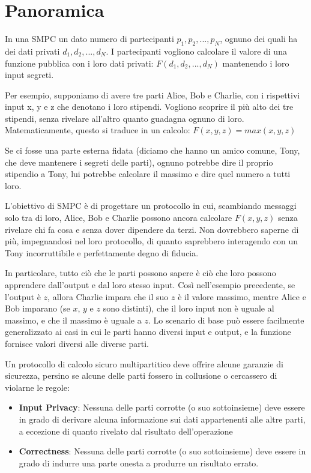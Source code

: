 \documentclass[
  italian,
]{book}
\providecommand{\tightlist}{%
  \setlength{\itemsep}{0pt}\setlength{\parskip}{0pt}}
\begin{document}
\hypertarget{panoramica}{%
\section{Panoramica}\label{panoramica}}

In una SMPC un dato numero di partecipanti \(p_1, p_2, ..., p_N\), ognuno dei quali ha dei dati privati \(d_1, d_2, ..., d_N\). I partecipanti vogliono calcolare il valore di una funzione pubblica con i loro dati privati: \(F(d_1, d_2, ..., d_N)\) mantenendo i loro input segreti.

Per esempio, supponiamo di avere tre parti Alice, Bob e Charlie, con i rispettivi input x, y e z che denotano i loro stipendi. Vogliono scoprire il più alto dei tre stipendi, senza rivelare all'altro quanto guadagna ognuno di loro. Matematicamente, questo si traduce in un calcolo: \(F(x, y, z) = max(x, y, z)\)

Se ci fosse una parte esterna fidata (diciamo che hanno un amico comune, Tony, che deve mantenere i segreti delle parti), ognuno potrebbe dire il proprio stipendio a Tony, lui potrebbe calcolare il massimo e dire quel numero a tutti loro.

L'obiettivo di SMPC è di progettare un protocollo in cui, scambiando messaggi solo tra di loro, Alice, Bob e Charlie possono ancora calcolare \(F(x, y, z)\) senza rivelare chi fa cosa e senza dover dipendere da terzi. Non dovrebbero saperne di più, impegnandosi nel loro protocollo, di quanto saprebbero interagendo con un Tony incorruttibile e perfettamente degno di fiducia.

In particolare, tutto ciò che le parti possono sapere è ciò che loro possono apprendere dall'output e dal loro stesso input. Così nell'esempio precedente, se l'output è \(z\), allora Charlie impara che il suo \(z\) è il valore massimo, mentre Alice e Bob imparano (se \(x\), \(y\) e \(z\) sono distinti), che il loro input non è uguale al massimo, e che il massimo è uguale a \(z\). Lo scenario di base può essere facilmente generalizzato ai casi in cui le parti hanno diversi input e output, e la funzione fornisce valori diversi alle diverse parti.

\newpage

Un protocollo di calcolo sicuro multipartitico deve offrire alcune garanzie di sicurezza, persino se alcune delle parti fossero in collusione o cercassero di violarne le regole:

\begin{itemize}
\tightlist
\item
  \textbf{Input Privacy}: Nessuna delle parti corrotte (o suo sottoinsieme) deve essere in grado di derivare alcuna informazione sui dati appartenenti alle altre parti, a eccezione di quanto rivelato dal risultato dell'operazione
\item
  \textbf{Correctness}: Nessuna delle parti corrotte (o suo sottoinsieme) deve essere in grado di indurre una parte onesta a produrre un risultato errato.
\end{itemize}
\end{document}
